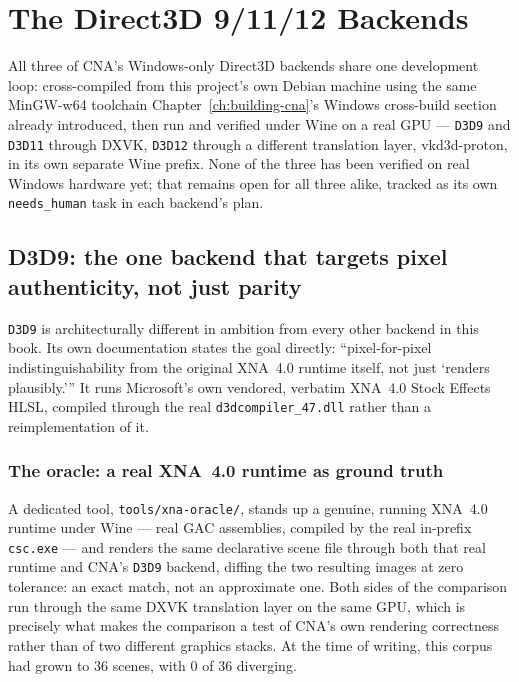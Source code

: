 \chapter{The Direct3D 9/11/12 Backends}
\label{ch:direct3d-backends}

All three of CNA's Windows-only Direct3D backends share one development loop:
cross-compiled from this project's own Debian machine using the same MinGW-w64 toolchain
Chapter~\ref{ch:building-cna}'s Windows cross-build section already introduced, then run and
verified under Wine on a real GPU --- \texttt{D3D9} and \texttt{D3D11} through DXVK,
\texttt{D3D12} through a different translation layer, vkd3d-proton, in its own separate Wine
prefix. None of the three has been verified on real Windows hardware yet; that remains open
for all three alike, tracked as its own \texttt{needs\_human} task in each backend's plan.

\section{D3D9: the one backend that targets pixel authenticity, not just parity}

\texttt{D3D9} is architecturally different in ambition from every other backend in this book.
Its own documentation states the goal directly: ``pixel-for-pixel indistinguishability from
the original XNA~4.0 runtime itself, not just `renders plausibly.''' It runs Microsoft's own
vendored, verbatim XNA~4.0 Stock Effects HLSL, compiled through the real
\texttt{d3dcompiler\_47.dll} rather than a reimplementation of it.

\subsection{The oracle: a real XNA~4.0 runtime as ground truth}

A dedicated tool, \texttt{tools/xna-oracle/}, stands up a genuine, running XNA~4.0 runtime
under Wine --- real GAC assemblies, compiled by the real in-prefix \texttt{csc.exe} --- and
renders the same declarative scene file through both that real runtime and CNA's \texttt{D3D9}
backend, diffing the two resulting images at zero tolerance: an exact match, not an
approximate one. Both sides of the comparison run through the same DXVK translation layer on
the same GPU, which is precisely what makes the comparison a test of CNA's own rendering
correctness rather than of two different graphics stacks. At the time of writing, this
corpus had grown to 36 scenes, with 0 of 36 diverging.

